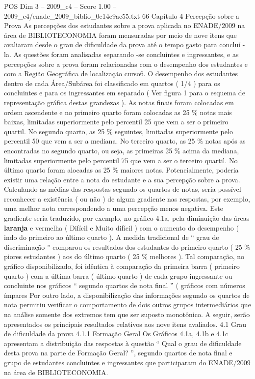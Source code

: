 \begin{textsample}{POS Dim 3 – 2009\_c4 – Score 1.00 – 2009\_c4/enade\_2009\_biblio\_0e14e9ac55.txt}  \label{ex:f3_pos_123}
66 Capítulo 4 Percepção sobre a Prova As percepções dos estudantes sobre a prova aplicada no ENADE/2009 na área de BIBLIOTECONOMIA foram mensuradas por meio de nove itens que avaliaram desde o grau de dificuldade da prova até o tempo gasto para concluí -la.
As questões foram analisadas separando -se concluintes e ingressantes, e as percepções sobre a prova foram relacionadas com o desempenho dos estudantes e com a Região Geográfica de localização curso6.
O desempenho dos estudantes dentro de cada Área/Subárea foi classificado em quartos ( 1/4 ) para os concluintes e para os ingressantes em separado ( Ver figura 1 para o esquema de representação gráfica destas grandezas ).
As notas finais foram colocadas em ordem ascendente e no primeiro quarto foram colocadas as 25 \% notas mais baixas, limitadas superiormente pelo percentil 25 que vem a ser o primeiro quartil.
No segundo quarto, as 25 \% seguintes, limitadas superiormente pelo percentil 50 que vem a ser a mediana.
No terceiro quarto, as 25 \% notas após as encontradas no segundo quarto, ou seja, as primeiras 25 \% acima da mediana, limitadas superiormente pelo percentil 75 que vem a ser o terceiro quartil.
No último quarto foram alocadas as 25 \% maiores notas.
Potencialmente, poderia existir uma relação entre a nota do estudante e a sua percepção sobre a prova.
Calculando as médias das respostas segundo os quartos de notas, seria possível reconhecer a existência ( ou não ) de algum gradiente nas respostas, por exemplo, uma melhor nota correspondendo a uma percepção menos negativa.
Este gradiente seria traduzido, por exemplo, no gráfico 4.1a, pela diminuição das áreas \textbf{laranja} e vermelha ( Difícil e Muito difícil ) com o aumento do desempenho ( indo do primeiro ao último quarto ).
A medida tradicional de “ grau de discriminação ” comparou os resultados dos estudantes do primeiro quarto ( 25 \% piores estudantes ) aos do último quarto ( 25 \% melhores ).
Tal comparação, no gráfico disponibilizado, foi idêntica à comparação da primeira barra ( primeiro quarto ) com a última barra ( último quarto ) de cada grupo ingressante ou concluinte nos gráficos “ segundo quartos de nota final ” ( gráficos com números ímpares Por outro lado, a disponibilização das informações segundo os quartos de nota permitiu verificar o comportamento de dois outros grupos intermediários que na análise somente dos extremos tem que ser suposto monotônico.
A seguir, serão apresentados os principais resultados relativos aos nove itens avaliados. 4.1 Grau de dificuldade da prova 4.1.1 Formação Geral Os Gráficos 4.1a, 4.1b e 4.1c apresentam a distribuição das respostas à questão “ Qual o grau de dificuldade desta prova na parte de Formação Geral? ”, segundo quartos de nota final e grupo de estudantes concluintes e ingressantes que participaram do ENADE/2009 na área de BIBLIOTECONOMIA.

\end{textsample}
